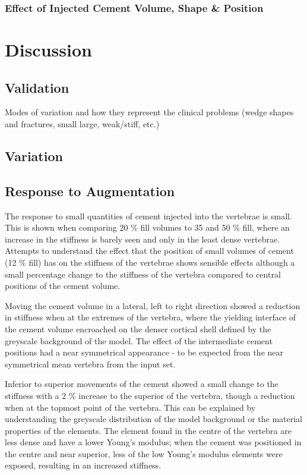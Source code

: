 \subsubsection{Effect of Injected Cement Volume, Shape \& Position}		


\pagebreak


\section{Discussion} \label{pca_disc}

\subsection{Validation}

Modes of variation and how they represent the clinical problems (wedge shapes
and fractures, small large, weak/stiff, etc.)

\subsection{Variation}

\subsection{Response to Augmentation}

The response to small quantities of cement injected into the vertebrae is
small. This is shown when comparing 20 \% fill volumes to 35 and 50 \% fill,
where an increase in the stiffness is barely seen and only in the least dense
vertebrae.  Attempts to understand the effect that the position of small
volumes of cement (12 \% fill) has on the stiffness of the vertebrae shows
sensible effects although a small percentage change to the stiffness of the
vertebra compared to central positions of the cement volume.



Moving the cement volume in a lateral, left to right direction showed a
reduction in stiffness when at the extremes of the vertebra, where the yielding
interface of the cement volume encroached on the denser cortical shell defined
by the greyscale background of the model.  The effect of the intermediate
cement positions had a near symmetrical appearance - to be expected from the
near symmetrical mean vertebra from the input set.

Inferior to superior movements of the cement showed a small change to the
stiffness with a 2 \% increase to the superior of the vertebra, though a
reduction when at the topmost point of the vertebra.  This can be explained by
understanding the greyscale distribution of the model background or the
material properties of the elements.  The element found in the centre of the
vertebra are less dense and have a lower Young's modulus; when the cement was
positioned in the centre and near superior, less of the low Young's modulus
elements were exposed, resulting in an increased stiffness.

